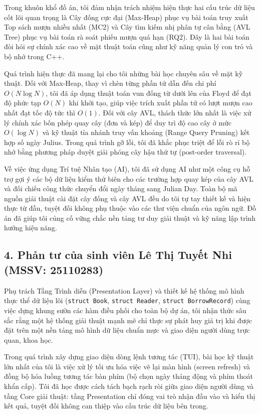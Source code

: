 \documentclass[14pt,a4paper]{extarticle}
\begin{document}
Trong khuôn khổ đồ án, tôi đảm nhận trách nhiệm hiện thực hai cấu trúc dữ liệu cốt lõi quan trọng là Cây đống cực đại (Max-Heap) phục vụ bài toán truy xuất Top sách mượn nhiều nhất (MC2) và Cây tìm kiếm nhị phân tự cân bằng (AVL Tree) phục vụ bài toán rà soát phiếu mượn quá hạn (RQ2). Đây là hai bài toán đòi hỏi sự chính xác cao về mặt thuật toán cũng như kỹ năng quản lý con trỏ và bộ nhớ trong C++.

Quá trình hiện thực đã mang lại cho tôi những bài học chuyên sâu về mặt kỹ thuật. Đối với Max-Heap, thay vì chèn từng phần tử dẫn đến chi phí $O(N \log N)$, tôi đã áp dụng thuật toán vun đống từ dưới lên của Floyd để đạt độ phức tạp $O(N)$ khi khởi tạo, giúp việc trích xuất phần tử có lượt mượn cao nhất đạt tốc độ tức thì $O(1)$. Đối với cây AVL, thách thức lớn nhất là việc xử lý chính xác bốn phép quay cây (đơn và kép) để duy trì độ cao cây ở mức $O(\log N)$ và kỹ thuật tỉa nhánh truy vấn khoảng (Range Query Pruning) kết hợp số ngày Julius. Trong quá trình gỡ lỗi, tôi đã khắc phục triệt để lỗi rò rỉ bộ nhớ bằng phương pháp duyệt giải phóng cây hậu thứ tự (post-order traversal).

Về việc ứng dụng Trí tuệ Nhân tạo (AI), tôi đã sử dụng AI như một công cụ hỗ trợ gợi ý các bộ dữ liệu kiểm thử biên cho các trường hợp quay kép của cây AVL và đối chiếu công thức chuyển đổi ngày tháng sang Julian Day. Toàn bộ mã nguồn giải thuật cài đặt cây đống và cây AVL đều do tôi tự tay thiết kế và hiện thực từ đầu, tuyệt đối không phụ thuộc vào các thư viện chuẩn của ngôn ngữ. Đồ án đã giúp tôi củng cố vững chắc nền tảng tư duy giải thuật và kỹ năng lập trình hướng hiệu năng.

\subsection*{4. Phản tư của sinh viên Lê Thị Tuyết Nhi (MSSV: 25110283)}

Phụ trách Tầng Trình diễn (Presentation Layer) và thiết kế hệ thống mô hình thực thể dữ liệu lõi (\texttt{struct Book}, \texttt{struct Reader}, \texttt{struct BorrowRecord}) cùng việc dựng khung sườn các hàm điều phối cho toàn bộ dự án, tôi nhận thức sâu sắc rằng một hệ thống giải thuật mạnh mẽ chỉ thực sự phát huy giá trị khi được đặt trên một nền tảng mô hình dữ liệu chuẩn mực và giao diện người dùng trực quan, khoa học.

Trong quá trình xây dựng giao diện dòng lệnh tương tác (TUI), bài học kỹ thuật lớn nhất của tôi là việc xử lý tối ưu hóa việc vẽ lại màn hình (screen refresh) và đồng bộ hóa luồng tương tác bàn phím (bộ chọn ngày tháng động và phím thoát khẩn cấp). Tôi đã học được cách tách bạch rạch ròi giữa giao diện người dùng và tầng Core giải thuật: tầng Presentation chỉ đóng vai trò nhận đầu vào và hiển thị kết quả, tuyệt đối không can thiệp vào cấu trúc dữ liệu bên trong.
\end{document}
